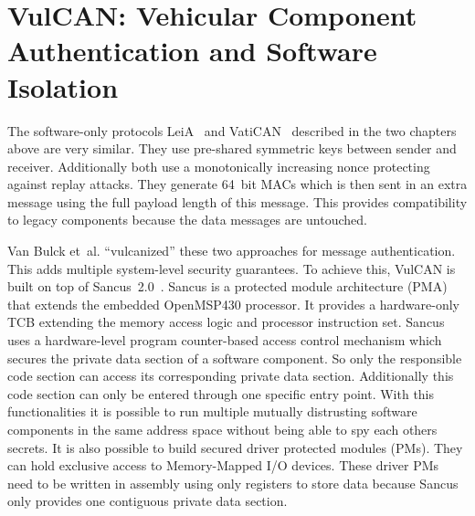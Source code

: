 
\section{VulCAN: Vehicular Component Authentication and Software Isolation}
\label{sec:vulcan}

The software-only protocols LeiA~\cite{Radu2016} and
VatiCAN~\cite{Nurnberger2016} described in the two chapters above are very
similar. They use pre-shared symmetric keys between sender and receiver.
Additionally both use a monotonically increasing nonce protecting against replay
attacks. They generate 64~bit MACs which is then sent in an extra message using
the full payload length of this message. This provides compatibility to legacy
components because the data messages are untouched.

Van Bulck et~al. ``vulcanized'' these two approaches for message authentication.
This adds multiple system-level security guarantees. To achieve this, VulCAN is
built on top of Sancus~2.0~\cite{Noorman}. Sancus is a protected module
architecture (PMA) that extends the embedded OpenMSP430 processor. It provides a
hardware-only TCB extending the memory access logic and processor instruction
set. Sancus uses a hardware-level program counter-based access control mechanism
which secures the private data section of a software component. So only the
responsible code section can access its corresponding private data section.
Additionally this code section can only be entered through one specific entry
point. With this functionalities it is possible to run multiple mutually
distrusting software components in the same address space without being able to
spy each others secrets. It is also possible to build secured driver protected
modules (PMs). They can hold exclusive access to Memory-Mapped I/O devices.
These driver PMs need to be written in assembly using only registers to store
data because Sancus only provides one contiguous private data section. 

